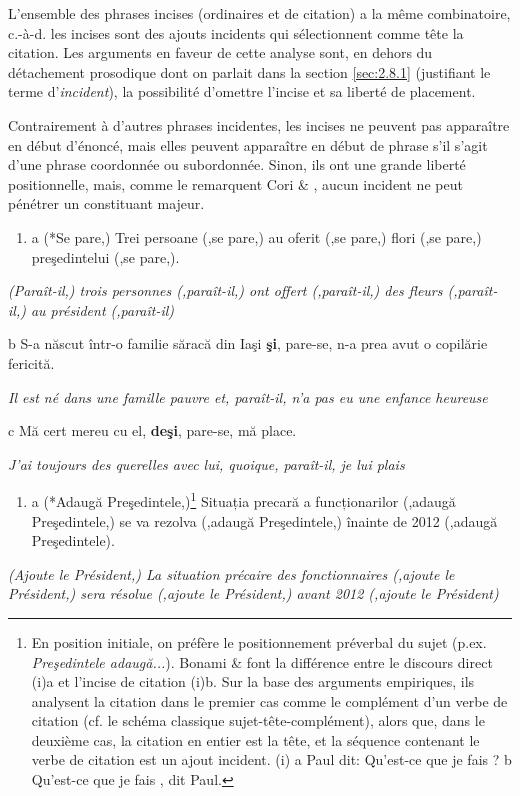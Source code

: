 L'ensemble des phrases incises (ordinaires et de citation) a la même combinatoire, c.-à-d. les incises sont des ajouts incidents qui sélectionnent comme tête la citation. Les arguments en faveur de cette analyse sont, en dehors du détachement prosodique dont on parlait dans la section \ref{sec:2.8.1} (justifiant le terme d'\textit{incident}), la possibilité d'omettre l'incise et sa liberté de placement. 

Contrairement à d'autres phrases incidentes, les incises ne peuvent pas apparaître en début d'énoncé, mais elles peuvent apparaître en début de phrase s'il s'agit d'une phrase coordonnée ou subordonnée. Sinon, ils ont une grande liberté positionnelle, mais, comme le remarquent Cori \& \citet{Marandin1995}, aucun incident ne peut pénétrer un constituant majeur. 


\begin{enumerate}
\item a  (*Se pare,) Trei persoane (,se pare,) au oferit (,se pare,) flori (,se pare,) preşedintelui (,se pare,).


\end{enumerate}
{\itshape
(Paraît-il,) trois personnes (,paraît-il,) ont offert (,paraît-il,) des fleurs (,paraît-il,) au président (,paraît-il)}

  b  S-a născut într-o familie săracă din Iaşi \textbf{şi}, pare-se, n-a prea avut o copilărie fericită.

{\itshape
Il est né dans une famille pauvre et, paraît-il, n'a pas eu une enfance heureuse}

  c  Mă cert mereu cu el, \textbf{deşi}, pare-se, mă place. 

{\itshape
J'ai toujours des querelles avec lui, quoique, paraît-il, je lui plais}


\begin{enumerate}
\item a  (*Adaugă Preşedintele,)\footnote{En position initiale, on préfère le positionnement préverbal du sujet (p.ex. \textit{Preşedintele adaugă...}). Bonami \& \citet{Godard2008b} font la différence entre le discours direct (i)a et l'incise de citation (i)b. Sur la base des arguments empiriques, ils analysent la citation dans le premier cas comme le complément d'un verbe de citation (cf. le schéma classique sujet-tête-complément), alors que, dans le deuxième cas, la citation en entier est la tête, et la séquence contenant le verbe de citation est un ajout incident.  
(i)  a  Paul dit: {\guillemotleft} Qu'est-ce que je fais ? {\guillemotright}
  b  {\guillemotleft} Qu'est-ce que je fais {\guillemotright}, dit Paul.} Situația precară a funcționarilor (,adaugă Preşedintele,) se va rezolva (,adaugă Preşedintele,) înainte de 2012 (,adaugă Preşedintele).


\end{enumerate}
{\itshape
(Ajoute le Président,) La situation précaire des fonctionnaires (,ajoute le Président,) sera résolue (,ajoute le Président,) avant 2012 (,ajoute le Président)}

